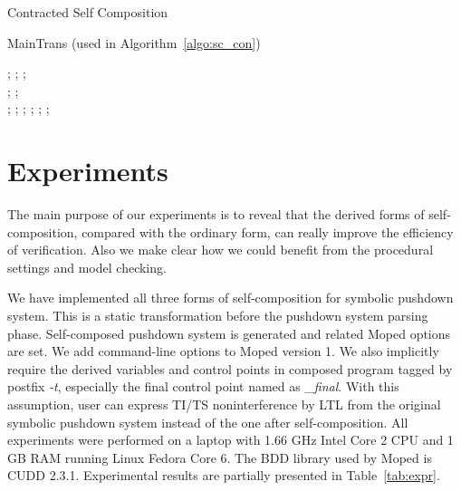 \documentclass{llncs}
\begin{document}
\begin{algorithm}
\caption{\label{algo:sc_con} Contracted Self Composition}

\KwData{}
\KwResult{}

\Begin{

\ForAll {} {
    ;
}

;

;

\ForAll {} {
    \lForAll {}
    {;}
}

;
;

\ForAll {} {
    \uIf {} {
        
        \hspace*{2cm};
}
    \uElseIf {} {
        
        \hspace*{2cm};
}
    \Else (\tcc*[f]{}) {
        
        \hspace*{2cm};
    }
    ;
}

;

}
\end{algorithm}

\begin{algorithm}
\caption{\label{algo:main_trans}MainTrans (used in
Algorithm~\ref{algo:sc_con})}

; ; ;\\
\While {} {
    ; ;\\
    \ForAll {} {
        \uIf {} {
            ; ;
        }
        \uIf {} {
            ; ;
        }
        \uIf {} {
            ;
        }
    }
    ;
}

\Return {;}
\end{algorithm}

\section{\label{sec:expr}Experiments}

The main purpose of our experiments is to reveal that the derived
forms of self-composition, compared with the ordinary form, can
really improve the efficiency of verification. Also we make clear
how we could benefit from the procedural settings and model
checking.

We have implemented all three forms of self-composition for symbolic
pushdown system. This is a static transformation before the pushdown
system parsing phase. Self-composed pushdown system is generated and
related Moped options are set. We add command-line options to Moped
version 1. We also implicitly require the derived variables and
control points in composed program tagged by postfix \emph{-t},
especially the final control point named as \emph{\_final}. With
this assumption, user can express TI/TS noninterference by LTL from
the original symbolic pushdown system instead of the one after
self-composition. All experiments were performed on a laptop with
1.66 GHz Intel Core 2 CPU and 1 GB RAM running Linux Fedora Core 6.
The BDD library used by Moped is CUDD 2.3.1. Experimental results
are partially presented in Table~\ref{tab:expr}.
\end{document}
